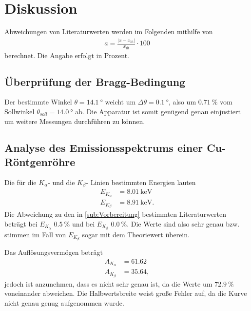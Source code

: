 \section{Diskussion}
\label{sec:Diskussion}

Abweichungen von Literaturwerten werden im Folgenden mithilfe von
\begin{align*}
    a=\frac{|x-x_{\text{lit}}|}{x_{\text{lit}}}\cdot 100 \label{eqn:abweich}
\end{align*}
berechnet. Die Angabe erfolgt in Prozent.

\subsection{Überprüfung der Bragg-Bedingung} %
\label{sub:Bragg_dis}
Der bestimmte Winkel $\theta=\qty{14.1}{\degree}$ weicht um $\Delta \theta =\qty{0.1}{\degree}$, also um $\qty{0.71}{\percent}$
vom Sollwinkel $\theta_{soll}=\qty{14.0}{\degree}$ ab.
Die Apparatur ist somit genügend genau einjustiert um weitere Messungen durchführen zu können.


\subsection{Analyse des Emissionsspektrums einer Cu-Röntgenröhre} %
\label{sub:Emission_dis}

Die für die $K_\alpha$- und die $K_\beta$- Linien bestimmten Energien lauten
\begin{align*}
    E_{K_\alpha}&= \qty{8.01}{\kilo\electronvolt}\\
    E_{K_\beta}&= \qty{8.91}{\kilo\electronvolt}.
\end{align*} 
Die Abweichung zu den in \autoref{sub:Vorbereitung} bestimmten Literaturwerten beträgt bei $E_{K_\alpha}$ $\qty{0.5}{\percent}$
und bei $E_{K_\beta}$ $\qty{0.0}{\percent}$. Die Werte sind also sehr genau bzw. stimmen im Fall von $E_{K_\beta}$ sogar mit dem
Theoriewert überein.

Das Auflösungsvermögen beträgt
\begin{align*}
    A_{K_\alpha} &= 61.62\\
    A_{K_\beta} &= 35.64,
\end{align*}
jedoch ist anzunehmen, dass es nicht sehr genau ist, da die Werte um $\qty{72.9}{\percent}$ voneinander abweichen.
Die Halbwertsbreite weist große Fehler auf, da die Kurve nicht genau genug aufgenommen wurde.

